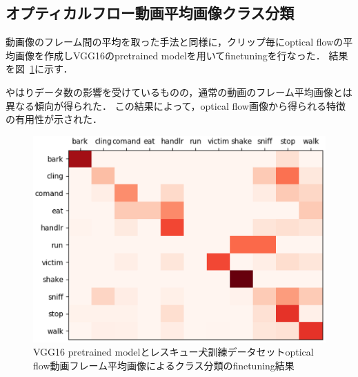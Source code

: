 \subsection{オプティカルフロー動画平均画像クラス分類}
動画像のフレーム間の平均を取った手法と同様に，クリップ毎にoptical flowの平均画像を作成しVGG16のpretrained modelを用いてfinetuningを行なった．
結果を図~\ref{sub_optresque_res}に示す．

やはりデータ数の影響を受けているものの，通常の動画のフレーム平均画像とは異なる傾向が得られた．
この結果によって，optical flow画像から得られる特徴の有用性が示された．
\begin{figure}[htbp]
  \begin{center}
    \includegraphics[scale=0.7]{./Figures/resque_optmean_result.eps}
    \caption{VGG16 pretrained modelとレスキュー犬訓練データセットoptical flow動画フレーム平均画像によるクラス分類のfinetuning結果}
    \label{sub_optresque_res}
  \end{center}
\end{figure}
